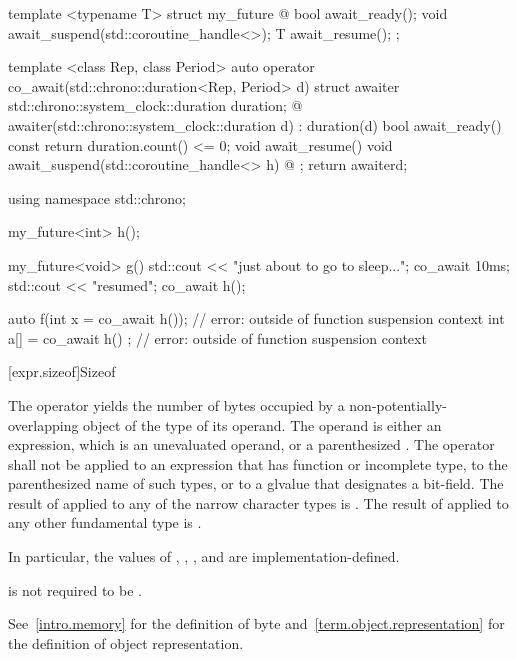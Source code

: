 \pnum
\begin{example}
\begin{codeblock}
template <typename T>
struct my_future {
  @\commentellip@
  bool await_ready();
  void await_suspend(std::coroutine_handle<>);
  T await_resume();
};

template <class Rep, class Period>
auto operator co_await(std::chrono::duration<Rep, Period> d) {
  struct awaiter {
    std::chrono::system_clock::duration duration;
    @\commentellip@
    awaiter(std::chrono::system_clock::duration d) : duration(d) {}
    bool await_ready() const { return duration.count() <= 0; }
    void await_resume() {}
    void await_suspend(std::coroutine_handle<> h) { @\commentellip@ }
  };
  return awaiter{d};
}

using namespace std::chrono;

my_future<int> h();

my_future<void> g() {
  std::cout << "just about to go to sleep...\n";
  co_await 10ms;
  std::cout << "resumed\n";
  co_await h();
}

auto f(int x = co_await h());   // error:  outside of function suspension context
int a[] = { co_await h() };     // error:  outside of function suspension context
\end{codeblock}
\end{example}

[expr.sizeof]{Sizeof}

\pnum
{}%
%
%
The  operator yields the number of bytes
occupied by a non-potentially-overlapping object of the type
of its operand. The operand is either an expression,
which is an unevaluated operand, or a parenthesized
.
%
The  operator shall not be applied to an expression that
has function or incomplete type,
to the parenthesized name of such
types, or to a glvalue that designates a bit-field.
The result of 
applied to any of the narrow character types is .
The result of
 applied to any other fundamental
type is .
\begin{note}
In particular, the values of , ,
, and  are
implementation-defined.
\begin{footnote}
 is not required to be .
\end{footnote}
\end{note}
\begin{note}
See~\ref{intro.memory} for the definition of byte
and~\ref{term.object.representation} for the definition of object representation.
\end{note}

